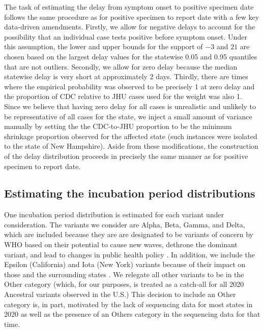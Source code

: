 \documentclass{article}
\begin{document}
The task of estimating the delay from symptom onset to positive specimen date 
follows the same procedure as for positive specimen to report date with a few key
 data-driven amendments. Firstly, we allow for negative delays to account for the
  possibility that an individual case tests positive before symptom onset. Under this
   assumption, the lower and upper bounds for the support of $-3$ and $21$ are 
   chosen based on the largest delay values for the statewise 0.05 and 0.95 quantiles
    that are not outliers. Secondly, we allow for zero delay because the median 
    statewise delay is very short at approximately 2 days. Thirdly, there are times where
     the empirical probability was observed to be precisely 1 at zero delay and the 
     proportion of CDC relative to JHU cases used for the weight was also 1. Since 
     we believe that having zero delay for all cases is unrealistic and unlikely to be 
     representative of all cases for the state, we inject a small amount of variance 
     manually by setting the the CDC-to-JHU proportion to be the minimum shrinkage
      proportion observed for the affected state (such instances were isolated to the
       state of New Hampshire). Aside from these modifications, the construction of 
       the delay distribution proceeds in precisely the same manner as for positive 
       specimen to report date. 

\subsection{Estimating the incubation period distributions} 

One incubation period distribution is estimated for each variant under consideration.
The variants we consider are Alpha, Beta, Gamma, and Delta, which are
 included because they are
are designated to be variants of concern by WHO based on their potential to
cause new waves, dethrone the dominant variant, and lead to changes in public
health policy \citep{who2021tracking}. In addition, we include the Epsilon
(California) and Iota (New York) variants because of their impact on those and
the surrounding states \citep{yang2022investigation, duerr2021dominance}. We
relegate all other variants to be in the Other category (which, for our purposes,
is treated as a catch-all for all 2020 Ancestral variants observed in the U.S.)
This decision to include an Other category is, in part,
motivated by the lack of sequencing data for most states in 2020 as well as the
presence of an Others category in the sequencing data for that time. 
\end{document}
